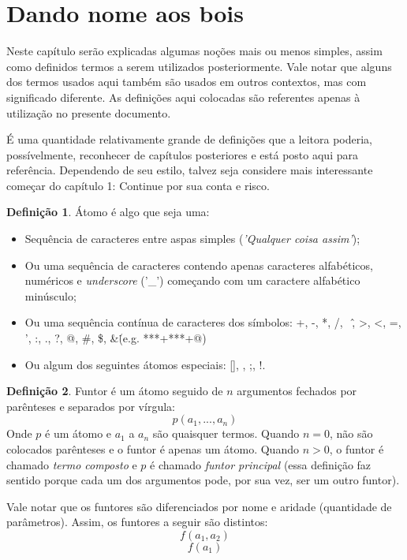 \documentclass{article}
\theoremstyle{definition}
\newtheorem{definition}{Definição}[section]
\theoremstyle{remark}
\begin{document}
\section{Dando nome aos bois}

Neste capítulo serão explicadas algumas noções mais ou menos simples, assim como definidos termos a serem utilizados posteriormente. Vale notar que alguns dos termos usados aqui também são usados em outros contextos, mas com significado diferente. As definições aqui colocadas são referentes apenas à utilização no presente documento.\par
É uma quantidade relativamente grande de definições que a leitora poderia, possívelmente, reconhecer de capítulos posteriores e está posto aqui para referência. Dependendo de seu estilo, talvez seja considere mais interessante começar do capítulo 1: Continue por sua conta e risco.



  \theoremstyle{definition}
  \begin{definition}{Átomo}
  é algo que seja uma:
    \begin{itemize}
      \item Sequência de caracteres entre aspas simples (\textit{'Qualquer coisa assim'});
      \item Ou uma sequência de caracteres contendo apenas caracteres alfabéticos, numéricos e \textit{underscore} ('\_') começando com um caractere alfabético minúsculo;
      \item Ou uma sequência contínua de caracteres dos símbolos: +, -, *, /, \, \^, >, <, =, ', :, ., ?, @, \#, \$, \&\. (e.g. ***+***+@)
      \item Ou algum dos seguintes átomos especiais: [], {}, ;, !.
    \end{itemize}
  \end{definition}


  \theoremstyle{definition}
  \begin{definition}{Funtor}
    é um átomo seguido de $n$ argumentos fechados por parênteses e separados por vírgula:
    \[
      p(a_1, ..., a_n)
    \]
    Onde $p$ é um átomo e $a_1$ a $a_n$ são quaisquer termos. Quando $n = 0$, não são colocados parênteses e o funtor é apenas um átomo. Quando $n > 0$, o funtor é chamado \textit{termo composto} e $p$ é chamado \textit{funtor principal} (essa definição faz sentido porque cada um dos argumentos pode, por sua vez, ser um outro funtor).
  \end{definition}
Vale notar que os funtores são diferenciados por nome e aridade (quantidade de parâmetros). Assim, os funtores a seguir são distintos:
    \[
      f(a_1, a_2)
    \]
    \[
      f(a_1)
    \]
\end{document}
